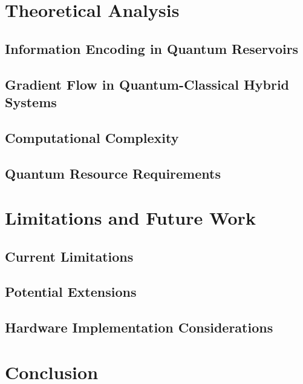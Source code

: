 \documentclass[conference]{IEEEtran}
\begin{document}
\section{Theoretical Analysis}
\subsection{Information Encoding in Quantum Reservoirs}
\subsection{Gradient Flow in Quantum-Classical Hybrid Systems}
\subsection{Computational Complexity}
\subsection{Quantum Resource Requirements}

\section{Limitations and Future Work}
\subsection{Current Limitations}
\subsection{Potential Extensions}
\subsection{Hardware Implementation Considerations}

\section{Conclusion}



\end{document}
